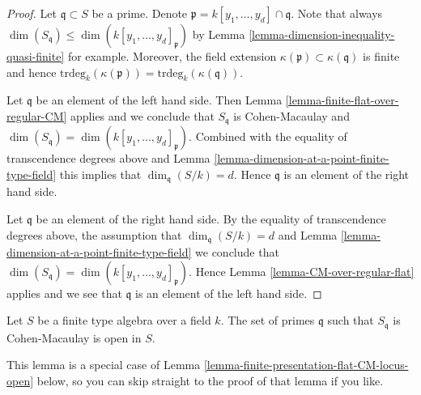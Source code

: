 \begin{proof}
Let $\mathfrak q \subset S$ be a prime. Denote
$\mathfrak p = k[y_1, \ldots, y_d] \cap \mathfrak q$.
Note that always
$\dim(S_{\mathfrak q}) \leq \dim(k[y_1, \ldots, y_d]_{\mathfrak p})$
by Lemma \ref{lemma-dimension-inequality-quasi-finite} for example.
Moreover, the field extension $\kappa(\mathfrak p) \subset \kappa(\mathfrak q)$
is finite and hence
$\text{trdeg}_k(\kappa(\mathfrak p)) = \text{trdeg}_k(\kappa(\mathfrak q))$.

\medskip\noindent
Let $\mathfrak q$ be an element of the left hand side.
Then Lemma \ref{lemma-finite-flat-over-regular-CM} applies
and we conclude that $S_{\mathfrak q}$ is Cohen-Macaulay
and $\dim(S_{\mathfrak q}) = \dim(k[y_1, \ldots, y_d]_{\mathfrak p})$.
Combined with the equality of transcendence degrees above and
Lemma \ref{lemma-dimension-at-a-point-finite-type-field} this
implies that $\dim_{\mathfrak q}(S/k) = d$. Hence $\mathfrak q$
is an element of the right hand side.

\medskip\noindent
Let $\mathfrak q$ be an element of the right hand side.
By the equality of transcendence degrees above, the assumption
that $\dim_{\mathfrak q}(S/k) = d$ and
Lemma \ref{lemma-dimension-at-a-point-finite-type-field}
we conclude that
$\dim(S_{\mathfrak q}) = \dim(k[y_1, \ldots, y_d]_{\mathfrak p})$.
Hence Lemma \ref{lemma-CM-over-regular-flat}
applies and we see that $\mathfrak q$ is an
element of the left hand side.
\end{proof}

\begin{lemma}
\label{lemma-finite-type-over-field-CM-open}
Let $S$ be a finite type algebra over a field $k$.
The set of primes $\mathfrak q$ such that $S_{\mathfrak q}$ is
Cohen-Macaulay is open in $S$.
\end{lemma}

\noindent
This lemma is a special case of
Lemma \ref{lemma-finite-presentation-flat-CM-locus-open} below,
so you can skip straight to the proof of that lemma if you like.

